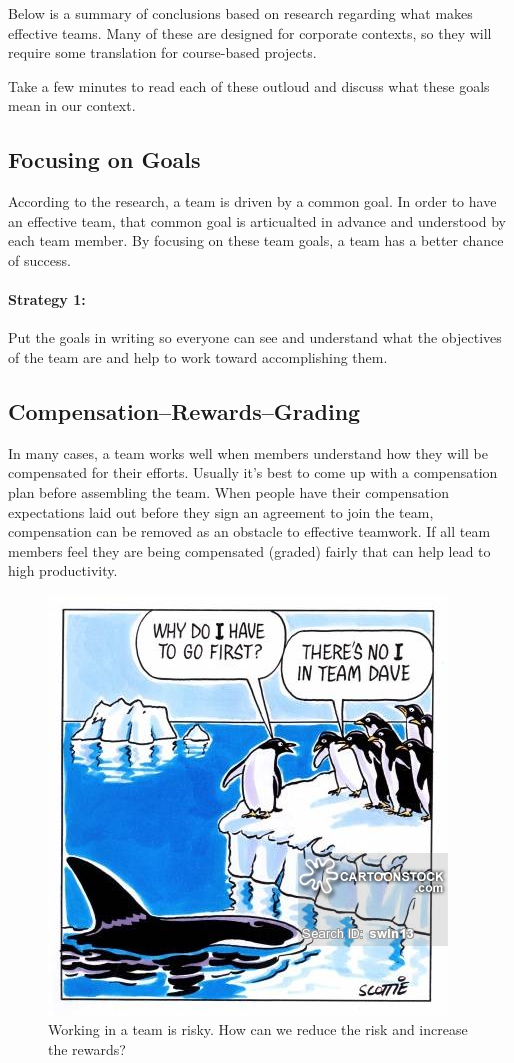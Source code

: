 \documentclass{article}\usepackage[]{graphicx}\usepackage[]{color}
\begin{document}
Below is a summary of conclusions based on research regarding what makes effective teams. Many of these are designed for corporate contexts, so they will require some translation for course-based projects.

Take a few minutes to read each of these outloud and discuss what these goals mean in our context.

\subsection{Focusing on Goals}

According to the research, a team is driven by a common goal. In order to have an effective team, that common goal is articualted in advance and understood by each team member. By focusing on these team goals, a team has a better chance of success. 

\paragraph{Strategy 1:} Put the goals in writing so everyone can see and understand what the objectives of the team are and help to work toward accomplishing them.

\subsection{Compensation--Rewards--Grading}

In many cases, a team works well when members understand how they will be compensated for their efforts. Usually it's best to come up with a compensation plan before assembling the team. When people have their compensation expectations laid out before they sign an agreement to join the team, compensation can be removed as an obstacle to effective teamwork. If all team members feel they are being compensated (graded) fairly that can help lead to high productivity.

\begin{figure}
\includegraphics[width=.50\textwidth]{../figure/PenguinTeamWork.jpg}
\caption{Working in a team is risky. How can we reduce the risk and increase the rewards?}
\end{figure}
\end{document}
